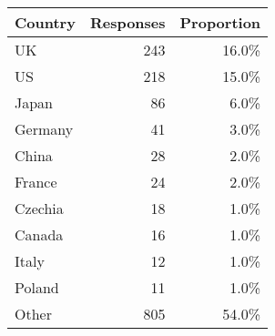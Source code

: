 \begin{tabular}{lrr}
\toprule
Country        &  Responses       &  Proportion \\
\midrule
UK             &       243 &            16.0\% \\
US             &       218 &            15.0\% \\
Japan          &        86 &             6.0\% \\
Germany        &        41 &             3.0\% \\
China          &        28 &             2.0\% \\
France         &        24 &             2.0\% \\
Czechia        &        18 &             1.0\% \\
Canada         &        16 &             1.0\% \\
Italy          &        12 &             1.0\% \\
Poland         &        11 &             1.0\% \\
Other          &       805 &            54.0\% \\
\bottomrule
\end{tabular}

